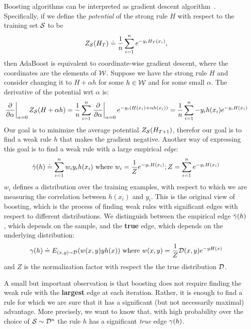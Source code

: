 Boosting algorithms can be interpreted as gradient descent
algorithm~\cite{mason_boosting_1999}. Specifically, if we define the {\em potential} of
the strong rule $H$ with respect to the training set ${\cal S}$ to be
\[
Z_{{\cal S}}(H_T) \doteq \frac{1}{n} \sum_{i=1}^n e^{- y_i H_T(x_i)},
\]
then AdaBoost is equivalent to coordinate-wise gradient descent,
where the coordinates are the elements of $\mathcal{W}$. Suppose we have the
strong rule $H$ and consider changing it to $H+\alpha h$ for some $h
\in \mathcal{W}$ and for some small $\alpha$. The derivative of the potential
wrt $\alpha$ is:
$$
\left.\frac{\partial}{\partial \alpha}\right|_{\alpha=0} Z_{{\cal S}}(H+\alpha h) =
\frac{1}{n} \sum_{i=1}^n \left.\frac{\partial}{\partial \alpha}\right|_{\alpha=0} e^{ - y_i (H(x_i)+\alpha h(x_i))}
=
\frac{1}{n} \sum_{i=1}^n -y_i h(x_i) e^{- y_i H(x_i)}
$$
Our goal is to minimize the average potential $Z_{{\cal S}}(H_{T+1})$, therefor our goal is to
find a weak rule $h$ that makes the gradient negative. Another way of
expressing this goal is to find a weak rule with a large empirical {\em edge}:
\begin{equation} \label{eqn:gamma_emp}
\hat{\gamma}(h) \doteq  \sum_{i=1}^n w_i y_i h(x_i) \mbox{ where } w_i =
\frac{1}{Z}e^{- y_i H(x_i)}; Z = \sum_{i=1}^n e^{- y_i H(x_i)}
\end{equation}
$w_i$ defines a distribution over the training examples, with respect
to which we are measuring the correlation between $h(x_i)$ and $y_i$.
This is the original view of boosting, which is the
process of finding weak rules with significant edges with respect to
different distributions. We distinguish between the empirical
edge $\hat{\gamma}(h)$, which depends on the sample, and the {\bf true} edge, which
depends on the underlying distribution:
\begin{equation} \label{eqn:gamma_emp}
\gamma(h) \doteq E_{(x,y) \sim {\cal D}}( w(x,y) y h(x)) \mbox{ where }
w(x,y)=\frac{1}{Z} {\cal D}(x,y) e^{- y H(x)}
\end{equation}
and $Z$ is the normalization factor with respect the the true
distribution ${\cal D}$.

A small but important observation is that boosting does not require
finding the weak rule with the {\bf largest} edge at each
iteration. Rather, it is enough to find a rule for which we are sure
that it has a significant (but not necessarily maximal)
advantage. More precisely, we want to know that, with high probability
over the choice of ${\cal S} \sim {\cal D}^n$  the rule $h$ has a significant
{\em true} edge $\gamma(h)$.

